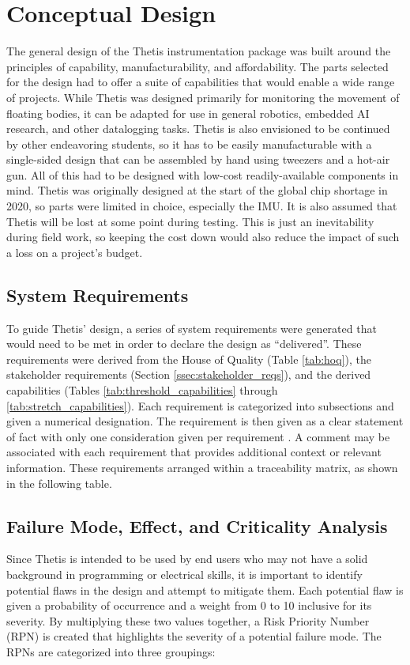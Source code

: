 \section{Conceptual Design} 
The general design of the Thetis instrumentation package was built around the principles of capability, manufacturability, and affordability.
The parts selected for the design had to offer a suite of capabilities that would enable a wide range of projects.
While Thetis was designed primarily for monitoring the movement of floating bodies, it can be adapted for use in general robotics, embedded AI research, and other datalogging tasks.
Thetis is also envisioned to be continued by other endeavoring students, so it has to be easily manufacturable with a single-sided design that can be assembled by hand using tweezers and a hot-air gun.
All of this had to be designed with low-cost readily-available components in mind.
Thetis was originally designed at the start of the global chip shortage in 2020, so parts were limited in choice, especially the IMU.
It is also assumed that Thetis will be lost at some point during testing.
This is just an inevitability during field work, so keeping the cost down would also reduce the impact of such a loss on a project's budget.

\subsection{System Requirements} 
To guide Thetis' design, a series of system requirements were generated that would need to be met in order to declare the design as ``delivered''.
These requirements were derived from the House of Quality (Table \ref{tab:hoq}), the stakeholder requirements (Section \ref{ssec:stakeholder_reqs}), and the derived capabilities (Tables \ref{tab:threshold_capabilities} through \ref{tab:stretch_capabilities}).
Each requirement is categorized into subsections and given a numerical designation.
The requirement is then given as a clear statement of fact with only one consideration given per requirement \cite{SystemsEngineeringHandbook-AppendixC}.
A comment may be associated with each requirement that provides additional context or relevant information.
These requirements arranged within a traceability matrix, as shown in the following table.



\subsection{Failure Mode, Effect, and Criticality Analysis} 
Since Thetis is intended to be used by end users who may not have a solid background in programming or electrical skills, it is important to identify potential flaws in the design and attempt to mitigate them.
Each potential flaw is given a probability of occurrence and a weight from 0 to 10 inclusive for its severity. 
By multiplying these two values together, a Risk Priority Number (RPN) is created that highlights the severity of a potential failure mode. The RPNs are categorized into three groupings:

